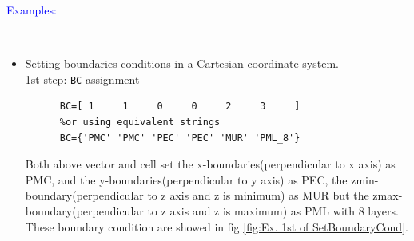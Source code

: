 	\textcolor{blue}{\begin{large}Examples:\end{large}}\\
\begin{itemize}
 \item    Setting boundaries conditions in a Cartesian coordinate system.\\
       1st step: \texttt{BC} assignment
    \begin{myindentpar}
	  \begin{lstlisting}[caption={BC assignment as fig \ref{fig:Ex. 1st of SetBoundaryCond} },label={listing:1st SettingofBC}]
	  %using numbers 
	  BC=[ 1     1     0     0     2     3     ] 
	  %or using equivalent strings
	  BC={'PMC' 'PMC' 'PEC' 'PEC' 'MUR' 'PML_8'} 
		      \end{lstlisting}
	  Both above vector and cell set  the x-boundaries(perpendicular to x axis) as PMC, and the y-boundaries(perpendicular to y axis) as PEC, the zmin-boundary(perpendicular to z axis and z is minimum) as MUR but the zmax-boundary(perpendicular to z axis and z is maximum) as PML with 8 layers. These boundary condition are showed in fig \ref{fig:Ex. 1st of SetBoundaryCond}.
	      \begin{figure}[ht]
		      \centering
		    \qquad
		    \qquad 

\end{figure}
\end{myindentpar}
\end{itemize}
